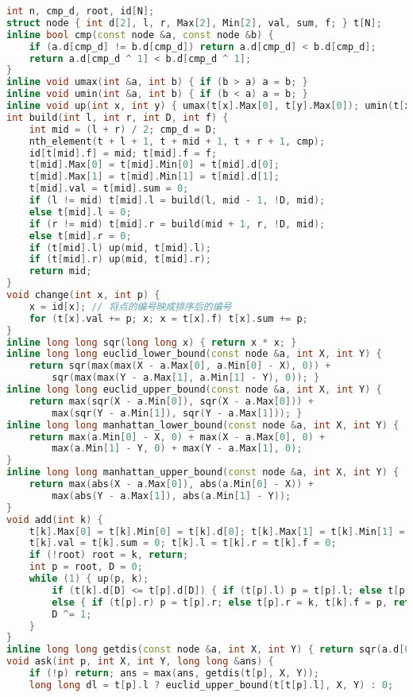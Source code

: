 \documentclass[landscape,a4paper]{article}
\begin{document}
\begin{lstlisting}[language=C++]
int n, cmp_d, root, id[N];
struct node { int d[2], l, r, Max[2], Min[2], val, sum, f; } t[N];
inline bool cmp(const node &a, const node &b) {
	if (a.d[cmp_d] != b.d[cmp_d]) return a.d[cmp_d] < b.d[cmp_d];
	return a.d[cmp_d ^ 1] < b.d[cmp_d ^ 1];
}
inline void umax(int &a, int b) { if (b > a) a = b; }
inline void umin(int &a, int b) { if (b < a) a = b; }
inline void up(int x, int y) { umax(t[x].Max[0], t[y].Max[0]); umin(t[x].Min[0], t[y].Min[0]); umax(t[x].Max[1], t[y].Max[1]); umin(t[x].Min[1], t[y].Min[1]); }
int build(int l, int r, int D, int f) {
	int mid = (l + r) / 2; cmp_d = D;
	nth_element(t + l + 1, t + mid + 1, t + r + 1, cmp);
	id[t[mid].f] = mid; t[mid].f = f;
	t[mid].Max[0] = t[mid].Min[0] = t[mid].d[0];
	t[mid].Max[1] = t[mid].Min[1] = t[mid].d[1];
	t[mid].val = t[mid].sum = 0;
	if (l != mid) t[mid].l = build(l, mid - 1, !D, mid);
	else t[mid].l = 0;
	if (r != mid) t[mid].r = build(mid + 1, r, !D, mid);
	else t[mid].r = 0;
	if (t[mid].l) up(mid, t[mid].l);
	if (t[mid].r) up(mid, t[mid].r);
	return mid;
}
void change(int x, int p) {
	x = id[x]; // 将点的编号映成排序后的编号
	for (t[x].val += p; x; x = t[x].f) t[x].sum += p;
}
inline long long sqr(long long x) { return x * x; }
inline long long euclid_lower_bound(const node &a, int X, int Y) {
	return sqr(max(max(X - a.Max[0], a.Min[0] - X), 0)) +
		sqr(max(max(Y - a.Max[1], a.Min[1] - Y), 0)); }
inline long long euclid_upper_bound(const node &a, int X, int Y) {
	return max(sqr(X - a.Min[0]), sqr(X - a.Max[0])) +
		max(sqr(Y - a.Min[1]), sqr(Y - a.Max[1])); }
inline long long manhattan_lower_bound(const node &a, int X, int Y) {
	return max(a.Min[0] - X, 0) + max(X - a.Max[0], 0) + 
		max(a.Min[1] - Y, 0) + max(Y - a.Max[1], 0);
}
inline long long manhattan_upper_bound(const node &a, int X, int Y) {
	return max(abs(X - a.Max[0]), abs(a.Min[0] - X)) + 
		max(abs(Y - a.Max[1]), abs(a.Min[1] - Y));
}
void add(int k) {
	t[k].Max[0] = t[k].Min[0] = t[k].d[0]; t[k].Max[1] = t[k].Min[1] = t[k].d[1];
	t[k].val = t[k].sum = 0; t[k].l = t[k].r = t[k].f = 0;
	if (!root) root = k, return;
	int p = root, D = 0;
	while (1) { up(p, k);
		if (t[k].d[D] <= t[p].d[D]) { if (t[p].l) p = t[p].l; else t[p].l = k, t[k].f = p, return; }
		else { if (t[p].r) p = t[p].r; else t[p].r = k, t[k].f = p, return; } 
		D ^= 1;
	}
}
inline long long getdis(const node &a, int X, int Y) { return sqr(a.d[0] - X) + sqr(a.d[1] - Y); }
void ask(int p, int X, int Y, long long &ans) {
	if (!p) return; ans = max(ans, getdis(t[p], X, Y));
	long long dl = t[p].l ? euclid_upper_bound(t[t[p].l], X, Y) : 0;

\end{lstlisting}
\end{document}
